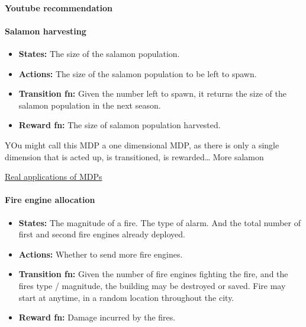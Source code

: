 \hypertarget{youtube-recommendation}{%
\paragraph{Youtube recommendation}\label{youtube-recommendation}}

\hypertarget{salamon-harvesting}{%
\paragraph{Salamon harvesting}\label{salamon-harvesting}}

\begin{itemize}
\tightlist
\item
  \textbf{States:} The size of the salamon population.
\item
  \textbf{Actions:} The size of the salamon population to be left to
  spawn.
\item
  \textbf{Transition fn:} Given the number left to spawn, it returns the
  size of the salamon population in the next season.
\item
  \textbf{Reward fn:} The size of salamon population harvested.
\end{itemize}

YOu might call this MDP a one dimensional MDP, as there is only a single
dimension that is acted up, is transitioned, is rewarded\ldots{} More
salamon

\href{http://www.it.uu.se/edu/course/homepage/aism/st11/MDPApplications1.pdf}{Real
applications of MDPs}

\hypertarget{fire-engine-allocation}{%
\paragraph{Fire engine allocation}\label{fire-engine-allocation}}

\begin{itemize}
\tightlist
\item
  \textbf{States:} The magnitude of a fire. The type of alarm. And the
  total number of first and second fire engines already deployed.
\item
  \textbf{Actions:} Whether to send more fire engines.
\item
  \textbf{Transition fn:} Given the number of fire engines fighting the
  fire, and the fires type / magnitude, the building may be destroyed or
  saved. Fire may start at anytime, in a random location throughout the
  city.
\item
  \textbf{Reward fn:} Damage incurred by the fires.
\end{itemize}

